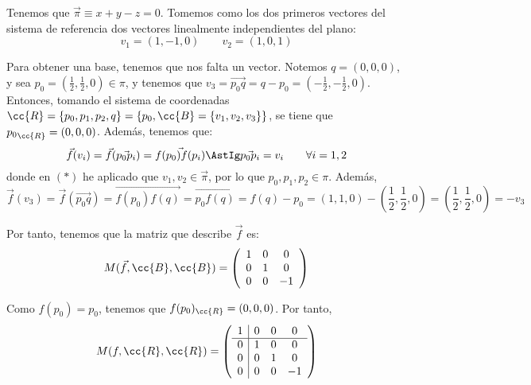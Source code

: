 \begin{ejemplo}
\begin{figure}[H]
    \end{figure}
    
    Tenemos que $\vec{\pi}\equiv x+y-z=0$. Tomemos como los dos primeros vectores del sistema de referencia dos vectores linealmente independientes del plano:
    $$v_1=(1,-1,0)\qquad v_2=(1,0,1)$$

    Para obtener una base, tenemos que nos falta un vector. Notemos $q=(0,0,0)$, y sea $p_0=\left(\frac{1}{2},\frac{1}{2},0\right)\in \pi$, y tenemos que $v_3=\vec{p_0q}=q-p_0=\left(-\frac{1}{2},-\frac{1}{2},0\right)$. Entonces, tomando el sistema de coordenadas $\cc{R}=\{p_0,p_1,p_2,q\}=\{p_0,\cc{B}=\{v_1,v_2,v_3\}\}$, se tiene que ${p_0}_{\cc{R}}=(0,0,0)$. Además, tenemos que:
    \begin{equation*}
        \vec{f}(v_i)=\vec{f}(\vec{p_0p_i}) = \vec{f(p_0)f(p_i)} \AstIg \vec{p_0p_i} = v_i \qquad \forall i=1,2
    \end{equation*}
    donde en $(\ast)$ he aplicado que $v_1,v_2\in \vec{\pi}$, por lo que $p_0,p_1,p_2\in \pi$. Además,
    \begin{equation*}
        \vec{f}(v_3) = \vec{f}(\vec{p_0q}) = \vec{f(p_0)f(q)} = \vec{p_0f(q)} = f(q) - p_0 = (1,1,0) - \left(\frac{1}{2},\frac{1}{2},0\right) = \left(\frac{1}{2},\frac{1}{2},0\right) = -v_3
    \end{equation*}

    Por tanto, tenemos que la matriz que describe $\vec{f}$ es:
    \begin{equation*}
        M(\vec{f},\cc{B},\cc{B}) = \left(\begin{array}{ccc}
        1 & 0 & 0\\
        0 & 1 & 0 \\
        0 & 0 & -1\\
    \end{array}\right)
    \end{equation*}

    Como $f(p_0)=p_0$, tenemos que $f(p_0)_{\cc{R}}=(0,0,0)$. Por tanto,    
    \begin{equation*}
        M(f,\cc{R},\cc{R}) = \left(\begin{array}{c|ccc}
        1 & 0 & 0 & 0 \\ \hline
        0 & 1 & 0 & 0\\
        0 & 0 & 1 & 0 \\
        0 & 0 & 0 & -1\\
    \end{array}\right)
    \end{equation*}\\


\end{ejemplo}
